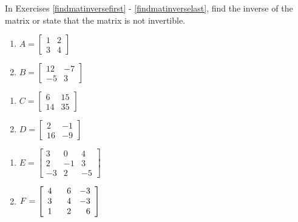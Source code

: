 \documentclass{ximera}
\begin{document}
	\author{Stitz-Zeager}



\label{ExercisesforMatMethods}

In Exercises \ref{findmatinversefirst} - \ref{findmatinverselast}, find the inverse of the matrix or state that the matrix is not invertible.

\begin{multicols}{2}
\begin{enumerate}

\item $A = \left[ \begin{array}{rr} 1 & 2 \\ 3 & 4 \end{array} \right]$ \label{findmatinversefirst}
\item $B = \left[ \begin{array}{rr} 12 & -7 \\ -5 & 3 \end{array} \right]$ \label{matrixB}

\setcounter{HW}{\value{enumi}}
\end{enumerate}
\end{multicols}

\begin{multicols}{2}
\begin{enumerate}
\setcounter{enumi}{\value{HW}}

\item $C = \left[ \begin{array}{rr} 6 & 15 \\ 14 & 35 \end{array} \right]$
\item $D = \left[ \begin{array}{rr} 2 & -1 \\ 16 & -9 \end{array} \right]$ \label{matrixD}

\setcounter{HW}{\value{enumi}}
\end{enumerate}
\end{multicols}

\begin{multicols}{2}
\begin{enumerate}
\setcounter{enumi}{\value{HW}}

\item $E = \left[ \begin{array}{rrr} 3 & 0 & 4 \\ 2 & -1 & 3 \\ -3 & 2 & -5 \end{array} \right]$ \label{matrixE}
\item $F = \left[ \begin{array}{rrr} 4 & \hphantom{-}6 & -3 \\ 3 & 4 & -3 \\ 1 & 2 & 6 \end{array} \right]$

\setcounter{HW}{\value{enumi}}
\end{enumerate}
\end{multicols}
\end{document}
